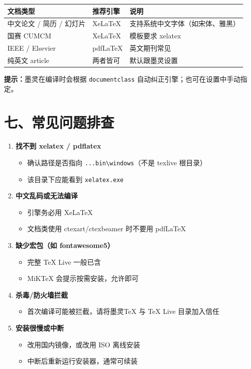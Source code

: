 \documentclass[UTF8,11pt]{article}
\begin{document}
\begin{center}
\begin{tabular}{@{}p{3.2cm}p{5.2cm}p{4.8cm}@{}}
\toprule
文档类型 & 推荐引擎 & 说明 \\
\midrule
中文论文 / 简历 / 幻灯片 & XeLaTeX & 支持系统中文字体（如宋体、雅黑） \\
国赛 CUMCM & XeLaTeX & 模板要求 xelatex \\
IEEE / Elsevier & pdfLaTeX & 英文期刊常见 \\
纯英文 article & 两者皆可 & 默认跟墨灵设置 \\
\bottomrule
\end{tabular}
\end{center}

\textcolor{ok}{\textbf{提示：}墨灵在编译时会根据 \texttt{documentclass} 自动纠正引擎；也可在设置中手动指定。}

\section*{七、常见问题排查}

\begin{enumerate}
  \item \textbf{找不到 xelatex / pdflatex}
  \begin{itemize}
    \item 确认路径是否指向 \texttt{...bin\textbackslash windows}（不是 texlive 根目录）
    \item 该目录下应能看到 \texttt{xelatex.exe}
  \end{itemize}
  \item \textbf{中文乱码或无法编译}
  \begin{itemize}
    \item 引擎务必用 XeLaTeX
    \item 文档类使用 ctexart/ctexbeamer 时不要用 pdfLaTeX
  \end{itemize}
  \item \textbf{缺少宏包（如 fontawesome5）}
  \begin{itemize}
    \item 完整 TeX Live 一般已含
    \item MiKTeX 会提示按需安装，允许即可
  \end{itemize}
  \item \textbf{杀毒/防火墙拦截}
  \begin{itemize}
    \item 首次编译可能被拦截，请将墨灵TeX 与 TeX Live 目录加入信任
  \end{itemize}
  \item \textbf{安装很慢或中断}
  \begin{itemize}
    \item 改用国内镜像，或改用 ISO 离线安装
    \item 中断后重新运行安装器，通常可续装
  \end{itemize}
\end{enumerate}
\end{document}
